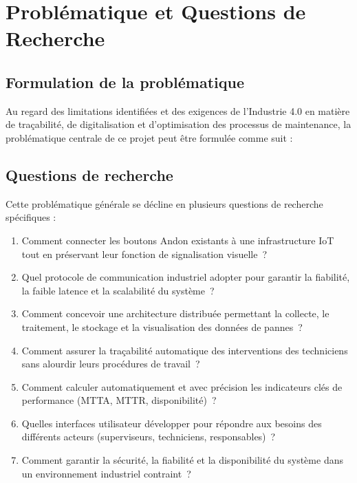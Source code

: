 \section{Problématique et Questions de Recherche}

\subsection{Formulation de la problématique}

Au regard des limitations identifiées et des exigences de l'Industrie 4.0 en matière de traçabilité, de digitalisation et d'optimisation des processus de maintenance, la problématique centrale de ce projet peut être formulée comme suit :

\begin{center}
\end{center}

\subsection{Questions de recherche}

Cette problématique générale se décline en plusieurs questions de recherche spécifiques :

\begin{enumerate}
    \item Comment connecter les boutons Andon existants à une infrastructure IoT tout en préservant leur fonction de signalisation visuelle~?
    \item Quel protocole de communication industriel adopter pour garantir la fiabilité, la faible latence et la scalabilité du système~?
    \item Comment concevoir une architecture distribuée permettant la collecte, le traitement, le stockage et la visualisation des données de pannes~?
    \item Comment assurer la traçabilité automatique des interventions des techniciens sans alourdir leurs procédures de travail~?
    \item Comment calculer automatiquement et avec précision les indicateurs clés de performance (MTTA, MTTR, disponibilité)~?
    \item Quelles interfaces utilisateur développer pour répondre aux besoins des différents acteurs (superviseurs, techniciens, responsables)~?
    \item Comment garantir la sécurité, la fiabilité et la disponibilité du système dans un environnement industriel contraint~?
\end{enumerate}


